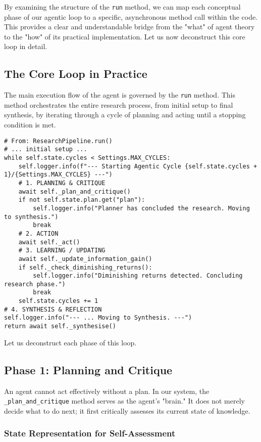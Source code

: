 \documentclass[12pt, a4paper]{article}
\begin{document}
By examining the structure of the \texttt{run} method, we can map each conceptual phase of our agentic loop to a specific, asynchronous method call within the code. This provides a clear and understandable bridge from the "what" of agent theory to the "how" of its practical implementation. Let us now deconstruct this core loop in detail.


\subsection{The Core Loop in Practice}

The main execution flow of the agent is governed by the \verb|run| method. This method orchestrates the entire research process, from initial setup to final synthesis, by iterating through a cycle of planning and acting until a stopping condition is met.

\begin{lstlisting}[style=myPython]
# From: ResearchPipeline.run()
# ... initial setup ...
while self.state.cycles < Settings.MAX_CYCLES:
    self.logger.info(f"--- Starting Agentic Cycle {self.state.cycles + 1}/{Settings.MAX_CYCLES} ---")
    # 1. PLANNING & CRITIQUE
    await self._plan_and_critique()
    if not self.state.plan.get("plan"):
        self.logger.info("Planner has concluded the research. Moving to synthesis.")
        break
    # 2. ACTION
    await self._act()
    # 3. LEARNING / UPDATING
    await self._update_information_gain()
    if self._check_diminishing_returns():
        self.logger.info("Diminishing returns detected. Concluding research phase.")
        break
    self.state.cycles += 1
# 4. SYNTHESIS & REFLECTION
self.logger.info("--- ... Moving to Synthesis. ---")
return await self._synthesise()
\end{lstlisting}

Let us deconstruct each phase of this loop.

\subsection{Phase 1: Planning and Critique}

An agent cannot act effectively without a plan. In our system, the \verb|_plan_and_critique| method serves as the agent's "brain." It does not merely decide what to do next; it first critically assesses its current state of knowledge.

\subsubsection{State Representation for Self-Assessment}
\end{document}
